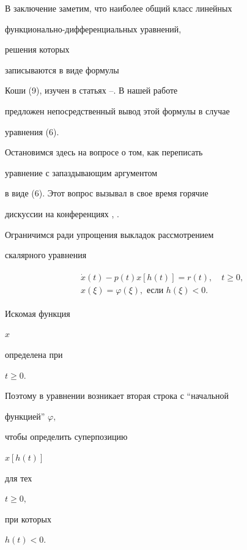 В заключение заметим, что наиболее общий класс линейных


функционально-диф\-фе\-рен\-ци\-аль\-ных уравнений,


решения которых


записываются в виде формулы


Коши (9), изучен в статьях \cite{Mak1}--\cite{Mak3}. В нашей работе


предложен непосредственный вывод этой формулы в случае


уравнения (6).





Остановимся здесь на вопросе о том, как переписать


уравнение с запаздывающим аргументом


в виде (6). Этот вопрос вызывал в свое время горячие


дискуссии на конференциях \cite{Mat1}, \cite{Mat2}.





Ограничимся ради упрощения выкладок рассмотрением


скалярного уравнения


\begin{align}


\begin{split}


&\Dot x (t) - p(t)x[h(t)] = r(t),\quad t\ge 0,\\[1mm]


& x(\xi) = \varphi(\xi), \text{ если }h(\xi) < 0.


\end{split}


\end{align}


Искомая функция


$x$


определена при


$t\ge 0.$


Поэтому в уравнении возникает вторая строка с ``начальной


функцией'' $\varphi,$


чтобы определить суперпозицию


$x[h(t)]$


для тех


$t\ge 0,$


при которых


$h(t) < 0.$





